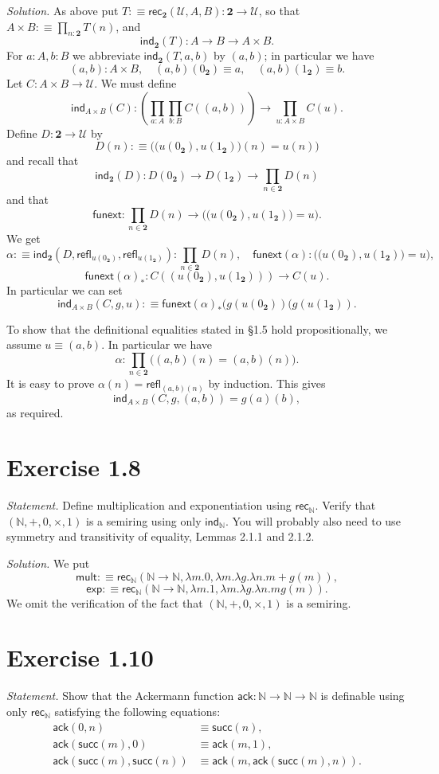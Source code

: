 \documentclass[12pt]{article}
\newcommand{\msf}{\mathsf}
\newcommand{\ack}{\mathsf{ack}}
\newcommand{\fu}{\mathsf{funext}}
\newcommand{\ind}{\mathsf{ind}}
\newcommand{\la}{\lambda}
\newcommand{\N}{\mathbb N}
\newcommand{\nn}{\noindent}
\newcommand{\rec}{\mathsf{rec}}
\newcommand{\refl}{\mathsf{refl}}
\newcommand{\su}{\mathsf{succ}}
\newcommand{\two}{\mathbf2}
\newcommand{\U}{\mathcal U}
\begin{document}
\nn\emph{Solution.} As above put $T:\equiv\rec_\two(\U,A,B):\two\to\U$, so that $A\times B:\equiv\prod_{n:\two}T(n)$, and 
$$
\ind_\two(T):A\to B\to A\times B.
$$ 
For $a:A,b:B$ we abbreviate $\ind_\two(T,a,b)$ by $(a,b)$; in particular we have 
$$
(a,b):A\times B,\quad(a,b)(0_\two)\equiv a,\quad(a,b)(1_\two)\equiv b.
$$ 
Let $C:A\times B\to\U$. We must define 
$$
\ind_{A\times B}(C):\left(\prod_{a:A}\prod_{b:B}C((a,b))\right)\to\prod_{u:A\times B}C(u).
$$ 
Define $D:\two\to\U$ by 
$$
D(n):\equiv\Big(\big(u(0_\two),u(1_\two)\big)(n)=u(n)\Big)
$$ 
and recall that 
$$
\ind_\two(D):D(0_\two)\to D(1_\two)\to\prod_{n\in\two}D(n)
$$ 
and that 
$$
\fu:\prod_{n\in\two}D(n)\to\Big(\big(u(0_\two),u(1_\two)\big)=u\Big).
$$
We get 
$$
\alpha:\equiv\ind_\two(D,\refl_{u(0_\two)},\refl_{u(1_\two)}):\prod_{n\in\two}D(n),\quad\fu(\alpha):\Big(\big(u(0_\two),u(1_\two)\big)=u\Big),
$$
$$
\fu(\alpha)_*:C((u(0_\two),u(1_\two)))\to C(u).
$$
In particular we can set
$$
\ind_{A\times B}(C,g,u):\equiv\fu(\alpha)_*(g(u(0_\two))(g(u(1_\two)).
$$

To show that the definitional equalities stated in \S1.5 hold propositionally, we assume $u\equiv(a,b)$. In particular we have 
$$
\alpha:\prod_{n\in\two}\Big((a,b)(n)=(a,b)(n)\Big).
$$ 
It is easy to prove $\alpha(n)=\refl_{(a,b)(n)}$ by induction. This gives 
$$
\ind_{A\times B}(C,g,(a,b))=g(a)(b),
$$ 
as required.


\section{Exercise 1.8}

\emph{Statement.} Define multiplication and exponentiation using $\rec_\N$. Verify that $(\N,+,0,\times,1)$ is a semiring using only $\ind_\N$. You will probably also need to use symmetry and transitivity of equality, Lemmas 2.1.1 and 2.1.2.

\nn\emph{Solution.} We put
$$
\msf{mult}:\equiv\rec_\N(\N\to\N,\la m.0,\la m.\la g.\la n.m+g(m)),
$$
$$
\msf{exp}:\equiv\rec_\N(\N\to\N,\la m.1,\la m.\la g.\la n.mg(m)).
$$ 
We omit the verification of the fact that $(\N,+,0,\times,1)$ is a semiring.


\section{Exercise 1.10}

\emph{Statement.} Show that the Ackermann function $\ack :\N\to\N\to\N$ is definable using only $\rec_\N$ satisfying the following equations:
\begin{align*}
\ack(0,n)&\equiv\su(n),\\
\ack(\su(m),0)&\equiv\ack(m,1),\\
\ack(\su(m),\su(n))&\equiv\ack(m,\ack(\su(m),n)).
\end{align*}
\end{document}
